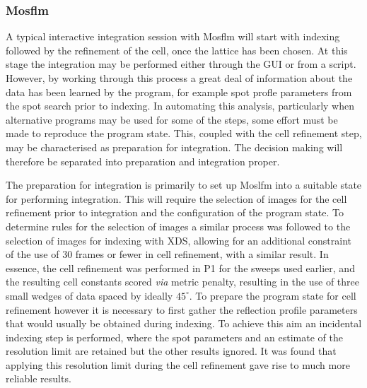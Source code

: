 \documentclass[preprint,pdf]{iucr}
\begin{document}
\subsubsection{Mosflm}

A typical interactive integration session with Mosflm will start with
indexing followed by the refinement of the cell, once the lattice has
been chosen. At this stage the integration may be performed either
through the GUI or from a script. However, by working through this
process a great deal of information about the data has been learned by
the program, for example spot profle parameters from the spot search
prior to indexing. In automating this analysis, particularly when
alternative programs may be used for some of the steps, some effort
must be made to reproduce the program state. This, coupled with the
cell refinement step, may be characterised as preparation for
integration. The decision making will therefore be separated into
preparation and integration proper.

The preparation for integration is primarily to set up Moslfm into
a suitable state for performing integration. This will require the
selection of images for the cell refinement prior to integration and
the configuration of the program state. To determine rules for the
selection of images a similar process was followed to the selection of
images for indexing with XDS, allowing for an additional constraint of
the use of 30 frames or fewer in cell refinement, with a similar
result. In essence, the cell refinement was performed in P1 for the
sweeps used earlier, and the resulting cell constants scored
\emph{via} metric penalty, resulting in the use of three small wedges
of data spaced by ideally $45^{\circ}$. To prepare the program state
for cell refinement however it is necessary to first gather the
reflection profile parameters that would usually be obtained during
indexing. To achieve this aim an incidental indexing step is
performed, where the spot parameters and an estimate of the resolution
limit are retained but the other results ignored. It was found that
applying this resolution limit during the cell refinement gave rise to
much more reliable results.
\end{document}
